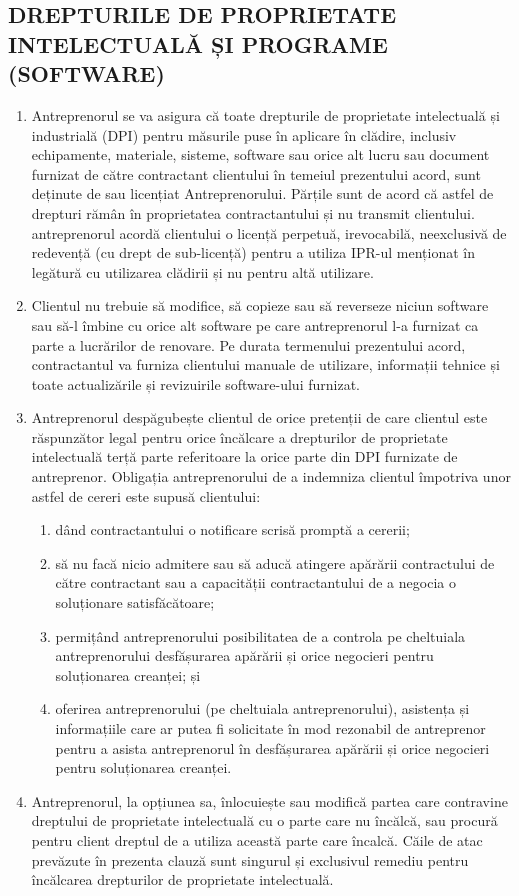 \begin{multicols}{2}
\subsection{DREPTURILE DE PROPRIETATE INTELECTUALĂ ȘI PROGRAME (SOFTWARE)}
\begin{enumerate}
\item Antreprenorul se va asigura că toate drepturile de proprietate intelectuală și industrială (DPI) pentru măsurile puse în aplicare în clădire, inclusiv echipamente, materiale, sisteme, software sau orice alt lucru sau document furnizat de către contractant clientului în temeiul prezentului acord, sunt deținute de sau licențiat Antreprenorului. Părțile sunt de acord că astfel de drepturi rămân în proprietatea contractantului și nu transmit clientului. antreprenorul acordă clientului o licență perpetuă, irevocabilă, neexclusivă de redevență (cu drept de sub-licență) pentru a utiliza IPR-ul menționat în legătură cu utilizarea clădirii și nu pentru altă utilizare.
\item Clientul nu trebuie să modifice, să copieze sau să reverseze niciun software sau să-l îmbine cu orice alt software pe care antreprenorul l-a furnizat ca parte a lucrărilor de renovare. Pe durata termenului prezentului acord, contractantul va furniza clientului manuale de utilizare, informații tehnice și toate actualizările și revizuirile software-ului furnizat.
\item Antreprenorul despăgubește clientul de orice pretenții de care clientul este răspunzător legal pentru orice încălcare a drepturilor de proprietate intelectuală terță parte referitoare la orice parte din DPI furnizate de antreprenor. Obligația antreprenorului de a indemniza clientul împotriva unor astfel de cereri este supusă clientului:
\begin{enumerate}
\item dând contractantului o notificare scrisă promptă a cererii;
\item să nu facă nicio admitere sau să aducă atingere apărării contractului de către contractant sau a capacității contractantului de a negocia o soluționare satisfăcătoare;
\item permițând antreprenorului posibilitatea de a controla pe cheltuiala antreprenorului desfășurarea apărării și orice negocieri pentru soluționarea creanței; și
\item oferirea antreprenorului (pe cheltuiala antreprenorului), asistența și informațiile care ar putea fi solicitate în mod rezonabil de antreprenor pentru a asista antreprenorul în desfășurarea apărării și orice negocieri pentru soluționarea creanței.
\end{enumerate}
\item Antreprenorul, la opțiunea sa, înlocuiește sau modifică partea care contravine dreptului de proprietate intelectuală cu o parte care nu încălcă, sau procură pentru client dreptul de a utiliza această parte care încalcă. Căile de atac prevăzute în prezenta clauză sunt singurul și exclusivul remediu pentru încălcarea drepturilor de proprietate intelectuală.
\end{enumerate}



\end{multicols}
